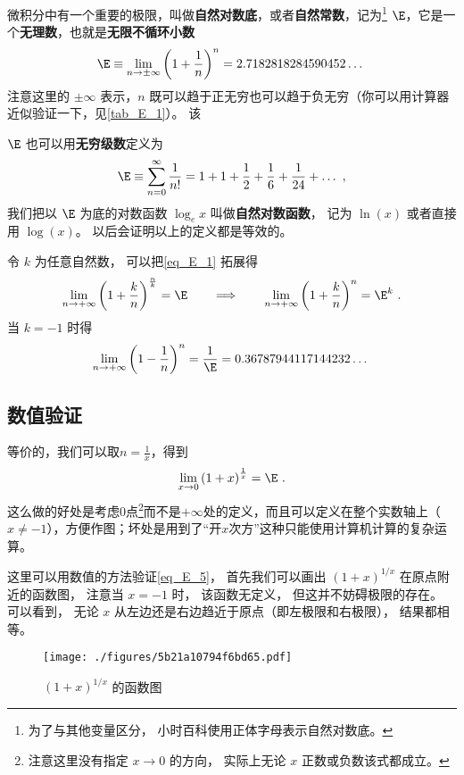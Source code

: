 
微积分中有一个重要的极限，叫做\textbf{自然对数底}，或者\textbf{自然常数}，记为\footnote{为了与其他变量区分， 小时百科使用正体字母表示自然对数底。} $\E$，它是一个\textbf{无理数}，也就是\textbf{无限不循环小数}
\begin{equation}\label{eq_E_1}
\E \equiv \lim_{n \to \pm\infty} \left(1 + \frac{1}{n}\right)^n = 2.7182818284590452\dots~
\end{equation}
注意这里的 $\pm\infty$ 表示，$n$ 既可以趋于正无穷也可以趋于负无穷（你可以用计算器近似验证一下，见\autoref{tab_E_1}）。 该

$\E$ 也可以用\textbf{无穷级数}定义为
\begin{equation}\label{eq_E_2}
\E \equiv \sum_{n=0}^\infty \frac{1}{n!} = 1 + 1 + \frac{1}{2} + \frac{1}{6} + \frac{1}{24} +\dots~,
\end{equation}
我们把以 $\E$ 为底的对数函数 $\log_e x$ 叫做\textbf{自然对数函数}， 记为 $\ln(x)$ 或者直接用 $\log(x)$。 以后会证明以上的定义都是等效的。 %

令 $k$ 为任意自然数， 可以把\autoref{eq_E_1} 拓展得
\begin{equation}\label{eq_E_4}
\lim_{n \to +\infty} \left(1 + \frac{k}{n}\right)^{\frac{n}{k}} = \E
\qquad \Longrightarrow\qquad
\lim_{n \to +\infty} \left(1 + \frac{k}{n}\right)^n = \E^k~.
\end{equation}
当 $k = -1$ 时得
\begin{equation}\label{eq_E_3}
\lim_{n \to +\infty} \left(1 - \frac{1}{n}\right)^n = \frac{1}{\E} = 0.36787944117144232\dots~
\end{equation}

\subsection{数值验证}
等价的，我们可以取$n = \frac{1}{x}$，得到
\begin{equation}\label{eq_E_5}
\lim_{x \to 0} \left(1 + x\right)^{\frac{1}{x}} = \E~.
\end{equation}
这么做的好处是考虑$0$点\footnote{注意这里没有指定 $x\to 0$ 的方向， 实际上无论 $x$ 正数或负数该式都成立。}而不是$+\infty$处的定义，而且可以定义在整个实数轴上（$x \neq -1$），方便作图；坏处是用到了“开$x$次方”这种只能使用计算机计算的复杂运算。

这里可以用数值的方法验证\autoref{eq_E_5}， 首先我们可以画出 $(1+x)^{1/x}$ 在原点附近的函数图， 注意当 $x = -1$ 时， 该函数无定义， 但这并不妨碍极限的存在。 可以看到， 无论 $x$ 从左边还是右边趋近于原点（即左极限和右极限）， 结果都相等。
\begin{figure}[ht]
\centering
\texttt{[image: ./figures/5b21a10794f6bd65.pdf]}
\caption{$(1+x)^{1/x}$ 的函数图} \label{fig_E_1}
\end{figure}

